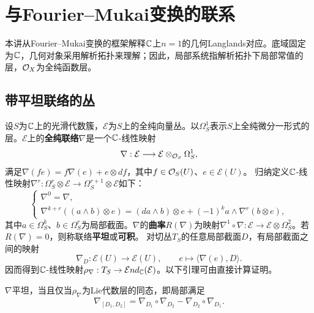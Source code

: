 \chapter{与Fourier--Mukai变换的联系}\label{L17}
本讲从Fourier--Mukai变换的框架解释$\mathbb{C}$上$n=1$的几何Langlands对应。底域固定为$\mathbb{C}$，几何对象采用解析拓扑来理解；因此，局部系统指解析拓扑下局部常值的层，$\mathcal O_X$为全纯函数层。
\section{带平坦联络的丛}\label{L17S1}
设$S$为$\mathbb{C}$上的光滑代数簇，$\mathcal E$为$S$上的全纯向量丛。以$\Omega_S^1$表示$S$上全纯微分一形式的层。$\mathcal E$上的\textbf{全纯联络}$\nabla$是一个$\mathbb{C}$-线性映射
\[\nabla:\mathcal E\longrightarrow\mathcal E\otimes_{\mathcal O_S}\Omega_S^1,\]
满足$\nabla(fe)=f\nabla(e)+e\otimes df$，其中$f\in\mathcal O_S(U)$、$e\in\mathcal E(U)$。
归纳定义$\mathbb{C}$-线性映射$\nabla^r:\Omega_S^r\otimes\mathcal E\to\Omega_S^{r+1}\otimes\mathcal E$如下：
\[\begin{cases}
\nabla^0=\nabla,\\
\nabla^{k+r}((a\wedge b)\otimes e)=(da\wedge b)\otimes e+(-1)^k a\wedge\nabla^r(b\otimes e),
\end{cases}\]
其中$a\in\Omega_S^k$、$b\in\Omega_S^r$为局部截面。$\nabla$的\textbf{曲率}$R(\nabla)$为映射$\nabla^1\circ\nabla:\mathcal E\to\mathcal E\otimes\Omega_S^2$。若$R(\nabla)=0$，则称联络\textbf{平坦}或\textbf{可积}。
对切丛$T_S$的任意局部截面$D$，有局部截面之间的映射
\[\nabla_D:\mathcal E(U)\longrightarrow\mathcal E(U),\qquad e\longmapsto\langle\nabla(e),D\rangle.\]
因而得到$\mathbb{C}$-线性映射$\rho_\nabla:T_S\to\mathcal End_{\mathbb{C}}(\mathcal E)$。以下引理可由直接计算证明。
\begin{lemma}\label{L17S1O1}
$\nabla$平坦，当且仅当$\rho_\nabla$为Lie代数层的同态，即局部满足
\[\nabla_{[D_1,D_2]}=\nabla_{D_1}\circ\nabla_{D_2}-\nabla_{D_2}\circ\nabla_{D_1}.\]
\end{lemma}
